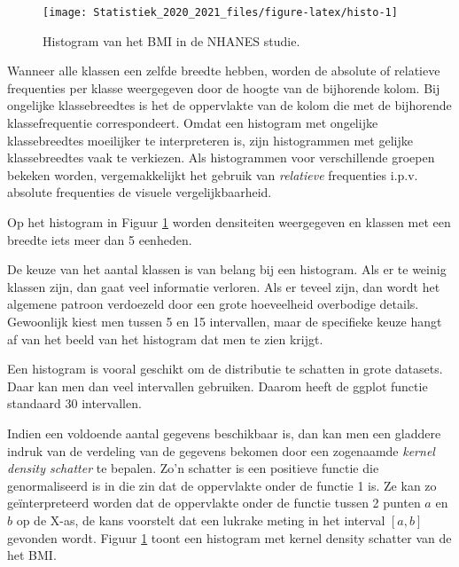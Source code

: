 \documentclass[
  12pt,dutch,coursenotes]{book}
\theoremstyle{definition}
\theoremstyle{definition}
\theoremstyle{definition}
\theoremstyle{remark}
\begin{document}
\begin{figure}

{\centering \texttt{[image: Statistiek\_2020\_2021\_files/figure-latex/histo-1]} 

}

\caption{Histogram van het BMI in de NHANES studie.}\label{fig:histo}
\end{figure}

Wanneer alle klassen
een zelfde breedte hebben, worden de absolute of relatieve frequenties per
klasse weergegeven door de hoogte van de bijhorende kolom. Bij ongelijke
klassebreedtes is het de oppervlakte van de kolom die met de bijhorende
klassefrequentie correspondeert. Omdat een histogram met ongelijke
klassebreedtes moeilijker te interpreteren is, zijn histogrammen met gelijke
klassebreedtes vaak te verkiezen. Als histogrammen voor verschillende
groepen bekeken worden, vergemakkelijkt het gebruik van \emph{relatieve}
frequenties i.p.v. absolute frequenties de visuele vergelijkbaarheid.

Op het histogram in Figuur \ref{fig:histo} worden densiteiten
weergegeven en klassen met een breedte iets meer dan 5 eenheden.

De keuze van het aantal klassen is van belang bij een histogram. Als er te
weinig klassen zijn, dan gaat veel informatie verloren. Als er teveel zijn,
dan wordt het algemene patroon verdoezeld door een grote hoeveelheid overbodige
details. Gewoonlijk kiest men tussen 5 en 15 intervallen, maar de specifieke
keuze hangt af van het beeld van het histogram dat men te zien krijgt.

Een histogram is vooral geschikt om de distributie te schatten in grote datasets. Daar kan men dan veel intervallen gebruiken. Daarom heeft de ggplot functie standaard 30 intervallen.

Indien een voldoende aantal gegevens beschikbaar is, dan kan men een
gladdere indruk van de verdeling van de gegevens bekomen door een zogenaamde \emph{kernel density schatter} te bepalen. Zo'n schatter is een positieve functie die genormaliseerd is in die zin dat de oppervlakte onder de functie 1 is. Ze kan zo geïnterpreteerd worden dat de oppervlakte onder de functie tussen 2 punten \(a\) en \(b\) op de X-as, de kans voorstelt dat een lukrake meting in het interval \([a,b]\) gevonden wordt. Figuur \ref{fig:histo} toont een histogram met kernel density schatter van de het BMI.
\end{document}
